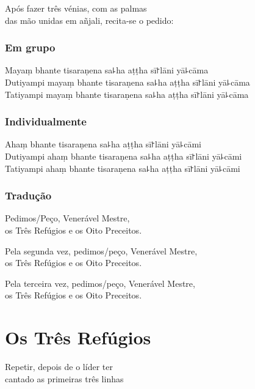 \begin{instruction}
  Após fazer três vénias, com as palmas\\
  das mão unidas em añjali, recita-se o pedido:
\end{instruction}

\subsection{Em grupo}

Mayaṃ bhante tisaraṇena sa꜕ha aṭṭha sī꜓lāni yā꜕cāma\\
Dutiyampi mayaṃ bhante tisaraṇena sa꜕ha aṭṭha sī꜓lāni yā꜕cāma\\
Tatiyampi mayaṃ bhante tisaraṇena sa꜕ha aṭṭha sī꜓lāni yā꜕cāma

\subsection{Individualmente}

Ahaṃ bhante tisaraṇena sa꜕ha aṭṭha sī꜓lāni yā꜕cāmi\\
Dutiyampi ahaṃ bhante tisaraṇena sa꜕ha aṭṭha sī꜓lāni yā꜕cāmi\\
Tatiyampi ahaṃ bhante tisaraṇena sa꜕ha aṭṭha sī꜓lāni yā꜕cāmi

\subsection{Tradução}

\begin{english}
  Pedimos/Peço, Venerável Mestre,\\
  \vin os Três Refúgios e os Oito Preceitos.

  Pela segunda vez, pedimos/peço, Venerável Mestre,\\
  \vin os Três Refúgios e os Oito Preceitos.

  Pela terceira vez, pedimos/peço, Venerável Mestre,\\
  \vin os Três Refúgios e os Oito Preceitos.
\end{english}

\clearpage
\chapter{Os Três Refúgios}

\begin{instruction}
  Repetir, depois de o líder ter\\
  cantado as primeiras três linhas
\end{instruction}

